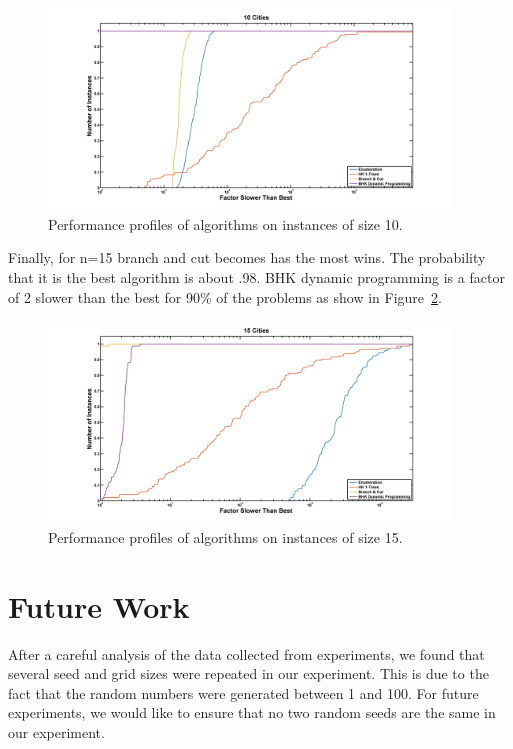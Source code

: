 \documentclass[11pt]{article}
\begin{document}
	\begin{figure}[H]
		\center
		\includegraphics[width=0.95\textwidth]{../performanceplots/perf10_norm.png}
		\caption{Performance profiles of algorithms on instances of size 10.}
		\label{fig:perf-10}
	\end{figure}
	
	Finally, for n=15 branch and cut becomes has the most wins. The probability that it is the best algorithm is about .98. BHK dynamic programming is a factor of 2 slower than the best for 90\% of the problems as show in Figure~\ref{fig:perf-15}. 
	
	\begin{figure}[H]
		\center
		\includegraphics[width=0.95\textwidth]{../performanceplots/perf15_norm.png}
		\caption{Performance profiles of algorithms on instances of size 15.}
		\label{fig:perf-15}
	\end{figure}
	\section{Future Work}
	\label{sec:future}
	After a careful analysis of the data collected from experiments, we found that several seed and grid sizes were repeated in our experiment. This is due to the fact that the random numbers were generated between 1 and 100. For future experiments, we would like to ensure that no two random seeds are the same in our experiment. 
	
\end{document}
